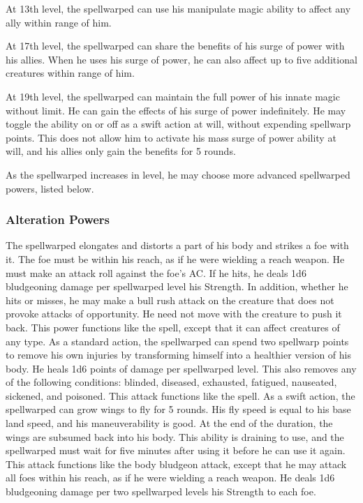 At 13th level, the spellwarped can use his manipulate magic ability to affect any ally within \rngmed range of him.

 At 17th level, the spellwarped can share the benefits of his surge of power with his allies. When he uses his surge of power, he can also affect up to five additional creatures within \rngmed range of him.

 At 19th level, the spellwarped can maintain the full power of his innate magic without limit. He can gain the effects of his surge of power indefinitely. He may toggle the ability on or off as a swift action at will, without expending spellwarp points. This does not allow him to activate his mass surge of power ability at will, and his allies only gain the benefits for 5 rounds.

As the spellwarped increases in level, he may choose more advanced spellwarped powers, listed below.

\subsubsection{Alteration Powers}
 The spellwarped elongates and distorts a part of his body and strikes a foe with it. The foe must be within his reach, as if he were wielding a reach weapon. He must make an attack roll against the foe's AC. If he hits, he deals 1d6 bludgeoning damage per spellwarped level \add his Strength. In addition, whether he hits or misses, he may make a bull rush attack on the creature that does not provoke attacks of opportunity. He need not move with the creature to push it back.
 This power functions like the  spell, except that it can affect creatures of any type.
 As a standard action, the spellwarped can spend two spellwarp points to remove his own injuries by transforming himself into a healthier version of his body. He heals 1d6 points of damage per spellwarped level. This also removes any of the following conditions: blinded, diseased, exhausted, fatigued, nauseated, sickened, and poisoned.
 This attack functions like the  spell.
 As a swift action, the spellwarped can grow wings to fly for 5 rounds. His fly speed is equal to his base land speed, and his maneuverability is good. At the end of the duration, the wings are subsumed back into his body. This ability is draining to use, and the spellwarped must wait for five minutes after using it before he can use it again.
 This attack functions like the body bludgeon attack, except that he may attack all foes within his reach, as if he were wielding a reach weapon. He deals 1d6 bludgeoning damage per two spellwarped levels \add his Strength to each foe.

